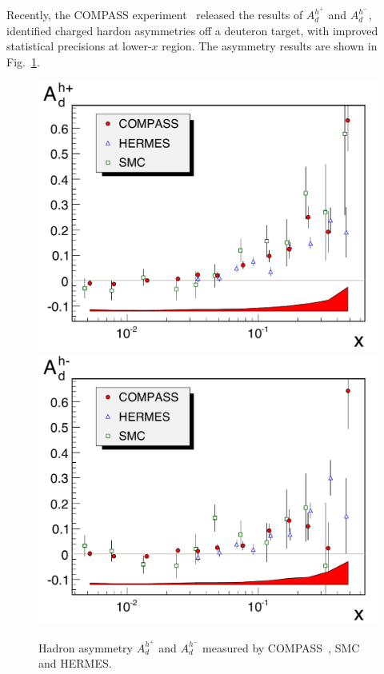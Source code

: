 Recently, the COMPASS experiment~\cite{compass2007} released the results of $A_d^{h^+}$ and $A_d^{h^-}$, identified charged hardon asymmetries off a deuteron target, with improved statistical precisions at lower-$x$ region. The asymmetry results are shown in Fig.~\ref{fig:compass1}.   
\begin{figure}[tbhp]
  \centering
    \includegraphics[width=0.48\linewidth]{./figs_xj/compass_apm_proc_12_p.pdf}
    \includegraphics[width=0.48\linewidth]{./figs_xj/compass_apm_proc_12_m.pdf}
\caption{\label{fig:compass1} Hadron asymmetry $A_d^{h^+}$ and $A_d^{h^-}$ measured by COMPASS~\protect\cite{compass2007}, SMC and HERMES.
}
\end{figure}

